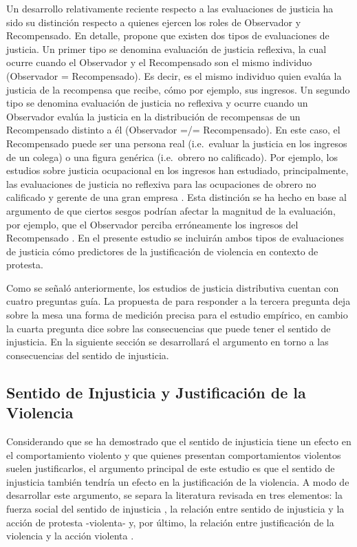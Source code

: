 \documentclass[12pt,twoside]{templates/facsothesis}
\begin{document}
Un desarrollo relativamente reciente respecto a las evaluaciones de justicia ha sido su distinción respecto a quienes ejercen los roles de Observador y Recompensado. En detalle, \citet{Jasso2015} propone que existen dos tipos de evaluaciones de justicia. Un primer tipo se denomina evaluación de justicia reflexiva, la cual ocurre cuando el Observador y el Recompensado son el mismo individuo (Observador = Recompensado). Es decir, es el mismo individuo quien evalúa la justicia de la recompensa que recibe, cómo por ejemplo, sus ingresos. Un segundo tipo se denomina evaluación de justicia no reflexiva y ocurre cuando un Observador evalúa la justicia en la distribución de recompensas de un Recompensado distinto a él (Observador =/= Recompensado). En este caso, el Recompensado puede ser una persona real (i.e.~evaluar la justicia en los ingresos de un colega) o una figura genérica (i.e.~obrero no calificado). Por ejemplo, los estudios sobre justicia ocupacional en los ingresos han estudiado, principalmente, las evaluaciones de justicia no reflexiva para las ocupaciones de obrero no calificado y gerente de una gran empresa \citep[e.g.][]{Verwiebe2000, Castillo2011a}. Esta distinción se ha hecho en base al argumento de que ciertos sesgos podrían afectar la magnitud de la evaluación, por ejemplo, que el Observador perciba erróneamente los ingresos del Recompensado \citep{Jasso2015}. En el presente estudio se incluirán ambos tipos de evaluaciones de justicia cómo predictores de la justificación de violencia en contexto de protesta.

Como se señaló anteriormente, los estudios de justicia distributiva cuentan con cuatro preguntas guía. La propuesta de \citet{Jasso1980} para responder a la tercera pregunta deja sobre la mesa una forma de medición precisa para el estudio empírico, en cambio la cuarta pregunta dice sobre las consecuencias que puede tener el sentido de injusticia. En la siguiente sección se desarrollará el argumento en torno a las consecuencias del sentido de injusticia.

\hypertarget{sentido-de-injusticia-y-justificaciuxf3n-de-la-violencia}{%
\subsection{Sentido de Injusticia y Justificación de la Violencia}\label{sentido-de-injusticia-y-justificaciuxf3n-de-la-violencia}}

Considerando que se ha demostrado que el sentido de injusticia tiene un efecto en el comportamiento violento y que quienes presentan comportamientos violentos suelen justificarlos, el argumento principal de este estudio es que el sentido de injusticia también tendría un efecto en la justificación de la violencia. A modo de desarrollar este argumento, se separa la literatura revisada en tres elementos: la fuerza social del sentido de injusticia \citep{Liebig2016}, la relación entre sentido de injusticia y la acción de protesta -violenta- \citep{BarringtonMoore1978, Galtung1969} y, por último, la relación entre justificación de la violencia y la acción violenta \citep{Markowitz2001, Nunes2021}.
\end{document}
